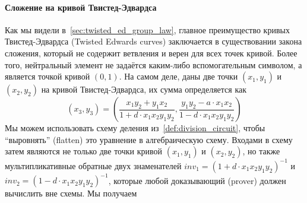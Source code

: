 \paragraph{Сложение на кривой Твистед-Эдвардса} Как мы видели в~\ref{sec:twisted_ed_group_law}, главное преимущество кривых Твистед-Эдвардса (Twisted Edwards curves) заключается в существовании закона сложения, который не содержит ветвления и верен для всех точек кривой. Более того, нейтральный элемент не задаётся каким-либо вспомогательным символом, а является точкой кривой $(0,1)$. На самом деле, даны две точки $(x_1,y_1)$ и $(x_2,y_2)$ на кривой Твистед-Эдвардса, их сумма определяется как
$$
(x_3,y_3) = \left(\frac{x_1y_2+y_1x_2}{1+d\cdot x_1x_2y_1y_2}, \frac{y_1y_2-a\cdot x_1x_2}{1-d\cdot x_1x_2y_1y_2}\right)
$$
Мы можем использовать схему деления из~\ref{def:division_circuit}, чтобы ``выровнять'' (flatten) это уравнение в алгебраическую схему. Входами в схему затем являются не только две точки кривой $(x_1,y_1)$ и $(x_2,y_2)$, но также мультипликативные обратные двух знаменателей $inv_1 = (1+d\cdot x_1x_2y_1y_2)^{-1}$ и $inv_2= (1-d\cdot x_1x_2y_1y_2)^{-1}$, которые любой доказывающий (prover) должен вычислить вне схемы. Мы получаем
